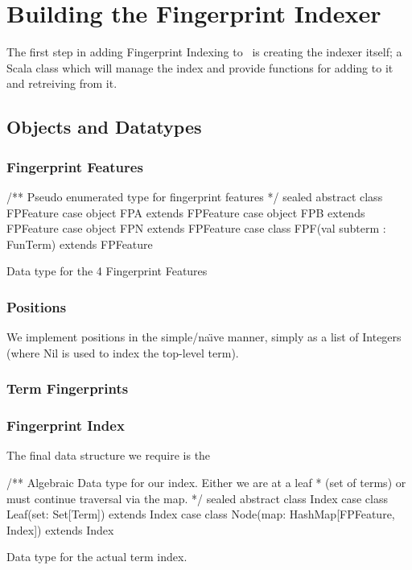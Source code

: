 \section{Building the Fingerprint Indexer}
\label{sec:initial}

The first step in adding Fingerprint Indexing to \beagle\ is creating the indexer
itself; a Scala class which will manage the index and provide functions for adding
to it and retreiving from it. 

\subsection{Objects and Datatypes}

\subsubsection{Fingerprint Features}

\begin{listing}[H]
\begin{scalacode}
/** Pseudo enumerated type for fingerprint features */
sealed abstract class FPFeature
case object FPA extends FPFeature 
case object FPB extends FPFeature
case object FPN extends FPFeature
case class  FPF(val subterm : FunTerm) extends FPFeature
\end{scalacode}
\caption{Data type for the 4 Fingerprint Features \protect\cite[p5]{shulz12}}
\label{lst:featuredata}
\end{listing}

\subsubsection{Positions}

We implement positions in the simple/na\"{\i}ve manner, simply as a list of
Integers (where Nil is used to index the top-level term).

\subsubsection{Term Fingerprints}

\subsubsection{Fingerprint Index}

The final data structure we require is the 

\begin{listing}[H]
\begin{scalacode}
/** Algebraic Data type for our index. Either we are at a leaf
  * (set of terms) or must continue traversal via the map. */ 
sealed abstract class Index
case class Leaf(set: Set[Term])                 extends Index
case class Node(map: HashMap[FPFeature, Index]) extends Index
\end{scalacode}
\caption{Data type for the actual term index. \protect\cite[p7]{shulz12}}
\label{lst:indexdata}
\end{listing}

